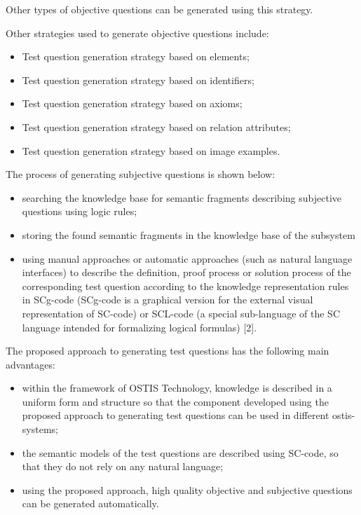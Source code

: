 \documentclass{article}
\begin{document}
\begin{multicols}{2}
Other types of objective questions can be generated
using this strategy.

Other strategies used to generate objective questions
include:
\begin{itemize}
    \item Test question generation strategy based on elements;
    \item Test question generation strategy based on identifiers;
    \item Test question generation strategy based on axioms;
    \item Test question generation strategy based on relation attributes;
    \item Test question generation strategy based on image examples.
\end{itemize}

The process of generating subjective questions is shown
below:
\begin{itemize}
    \item searching the knowledge base for semantic fragments describing subjective questions using logic rules;
    \item storing the found semantic fragments in the knowledge base of the subsystem
    \item using manual approaches or automatic approaches (such as natural language interfaces) to describe the definition, proof process or solution process of the corresponding test question according to the knowledge representation rules in SCg-code (SCg-code is a graphical version for the external visual representation of SC-code) or SCL-code (a special sub-language of the SC language intended for formalizing logical formulas) [2].
\end{itemize}

The proposed approach to generating test questions has
the following main advantages:
\begin{itemize}
    \item within the framework of OSTIS Technology, knowledge is described in a uniform form and structure so that the component developed using the proposed approach to generating test questions can be used in different ostis-systems;
    \item the semantic models of the test questions are described using SC-code, so that they do not rely on any natural language;
    \item using the proposed approach, high quality objective and subjective questions can be generated automatically.
\end{itemize}


\end{multicols}
\end{document}
